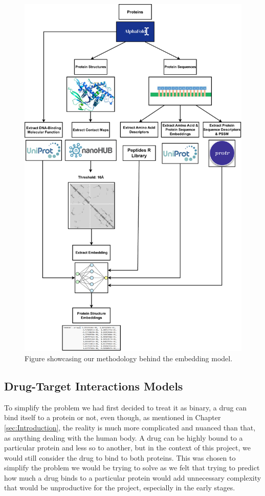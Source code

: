 \begin{figure}[!h]
    \centering
    \includegraphics[width=0.78\linewidth]{images/Embeddings_Methodology.pdf}    
    \caption{Figure showcasing our methodology behind the embedding model.}
    \label{fig:Embeddings_Methodology} 
\end{figure}

\subsection{Drug-Target Interactions Models}

To simplify the problem we had first decided to treat it as binary, a drug can bind itself to a protein or not, even though, as mentioned in Chapter \ref{sec:Introduction}, the reality is much more complicated and nuanced than that, as anything dealing with the human body. A drug can be highly bound to a particular protein and less so to another, but in the context of this project, we would still consider the drug to bind to both proteins. This was chosen to simplify the problem we would be trying to solve as we felt that trying to predict how much a drug binds to a particular protein would add unnecessary complexity that would be unproductive for the project, especially in the early stages. 

